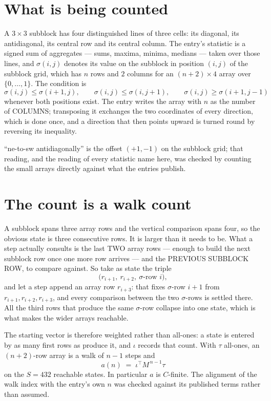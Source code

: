 \documentclass[11pt,a4paper]{article}
\theoremstyle{plain}
\theoremstyle{definition}
\begin{document}
\section{What is being counted}

A $3\times3$ subblock has four distinguished lines of three cells: its diagonal, its
antidiagonal, its central row and its central column. The entry's statistic is a signed sum of
aggregates --- sums, maxima, minima, medians --- taken over those lines, and $\sigma(i,j)$
denotes its value on the subblock in position $(i,j)$ of the subblock grid, which has $n$ rows
and $2$ columns for an $(n+2)\times4$ array over $\{0,\dots,1\}$. The condition is
\[
\sigma(i,j)\le\sigma(i+1,j),\qquad \sigma(i,j)\le\sigma(i,j+1),\qquad \sigma(i,j)\ge\sigma(i+1,j-1)
\]
whenever both positions exist. The entry writes the array with $n$ as the number of COLUMNS; transposing it exchanges the two coordinates of every direction, which is done once, and a direction that then points upward is turned round by reversing its inequality.

``ne-to-sw antidiagonally'' is the offset $(+1,-1)$ on the subblock grid; that reading, and
the reading of every statistic name here, was checked by counting the small arrays directly
against what the entries publish.

\section{The count is a walk count}

A subblock spans three array rows and the vertical comparison spans four, so the obvious state
is three consecutive rows. It is larger than it needs to be. What a step actually consults is
the last TWO array rows --- enough to build the next subblock row once one more row arrives ---
and the PREVIOUS SUBBLOCK ROW, to compare against. So take as state the triple
\[
\bigl(r_{i+1},\ r_{i+2},\ \sigma\text{-row }i\bigr),
\]
and let a step append an array row $r_{i+3}$: that fixes $\sigma$-row $i+1$ from
$r_{i+1},r_{i+2},r_{i+3}$, and every comparison between the two $\sigma$-rows is settled
there. All the third rows that produce the same $\sigma$-row collapse into one state, which is
what makes the wider arrays reachable.

The starting vector is therefore weighted rather than all-ones: a state is entered by as many
first rows as produce it, and $\iota$ records that count. With $\tau$ all-ones, an
$(n+2)$-row array is a walk of $n-1$ steps and
\[
a(n)\;=\;\iota^{\!\top}M^{\,n-1}\tau
\]
on the $S=432$ reachable states. In particular $a$ is $C$-finite. The alignment of the walk
index with the entry's own $n$ was checked against its published terms rather than assumed.
\end{document}
